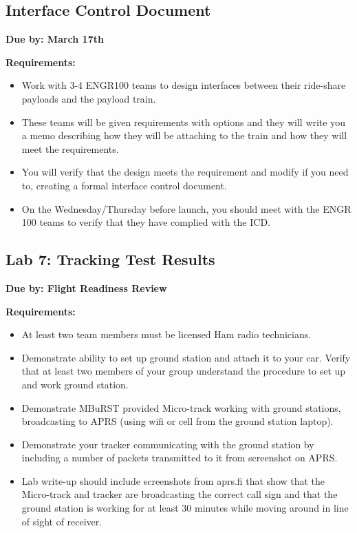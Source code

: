 \documentclass[11pt]{article}
\begin{document}
\subsection{Interface Control Document}

{\bf Due by: March 17th}

\noindent
{\bf Requirements:}

\begin{itemize}
    \item Work with 3-4 ENGR100 teams to design interfaces between
      their ride-share payloads and the payload train.
    \item These teams will be given requirements with options and they
      will write you a memo describing how they will be attaching to
      the train and how they will meet the requirements.
    \item You will verify that the design meets the requirement and
      modify if you need to, creating a formal interface control
      document.
    \item On the Wednesday/Thursday before launch, you should meet
      with the ENGR 100 teams to verify that they have complied with
      the ICD.
\end{itemize}

\subsection{Lab 7:  Tracking Test Results}

{\bf Due by: Flight Readiness Review}

\noindent
{\bf Requirements:}

\begin{itemize}
  \item At least two team members must be licensed Ham radio
    technicians.
  \item Demonstrate ability to set up ground station and attach it
      to your car. Verify that at least two members of your group
      understand the procedure to set up and work ground station.
    \item Demonstrate MBuRST provided Micro-track working with ground
      stations, broadcasting to APRS (using wifi or cell from the
      ground station laptop).
    \item Demonstrate your tracker communicating with the ground
      station by including a number of packets transmitted to it from
      screenshot on APRS.
    \item Lab write-up should include screenshots from aprs.fi that
      show that the Micro-track and tracker are broadcasting the
      correct call sign and that the ground station is working for at
      least 30 minutes while moving around in line of sight of
      receiver.
\end{itemize}
\end{document}
